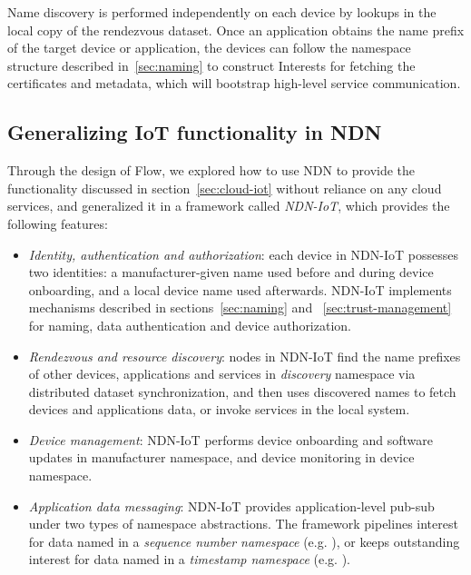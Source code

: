 {Name discovery is performed independently on each device by lookups in the local copy of the rendezvous dataset.
Once an application obtains the name prefix of the target device or application, the devices can follow the namespace structure described in~\ref{sec:naming} to construct Interests for fetching the certificates and metadata, which will bootstrap high-level service communication.

\subsection{Generalizing IoT functionality in NDN}

Through the design of Flow, we explored how to use NDN to provide the functionality discussed in section~\ref{sec:cloud-iot} without reliance on any cloud services, and generalized it in a framework called \textit{NDN-IoT}, which provides the following features: 

\begin{itemize}

\item \textit{Identity, authentication and authorization}: each device in NDN-IoT possesses two identities: a manufacturer-given name used before and during device onboarding, and a local device name used afterwards. NDN-IoT implements mechanisms described in sections~\ref{sec:naming} and ~\ref{sec:trust-management} for naming, data authentication and device authorization. 

\item \textit{Rendezvous and resource discovery}: nodes in NDN-IoT find the name prefixes of other devices, applications and services in \textit{discovery} namespace via distributed dataset synchronization, and then uses discovered names to fetch devices and applications data, or invoke services in the local system. 

\item \textit{Device management}: NDN-IoT performs device onboarding and software updates in manufacturer namespace, and device monitoring in device namespace. 

\item \textit{Application data messaging}: NDN-IoT provides application-level pub-sub under two types of namespace abstractions. The framework pipelines interest for data named in a \textit{sequence number namespace} (e.g. ), or keeps outstanding interest for data named in a \textit{timestamp namespace} (e.g. ).


\end{itemize}}
